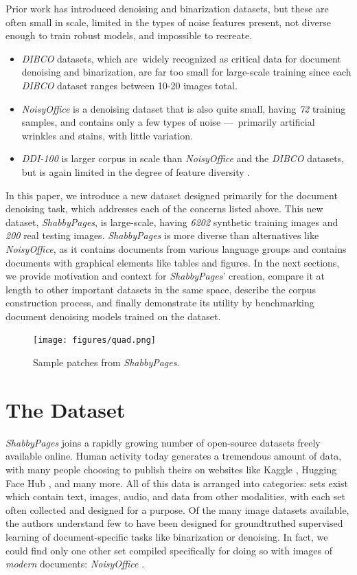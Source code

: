 \documentclass[runningheads]{llncs}
\begin{document}
Prior work has introduced denoising and binarization datasets, but these are often small in scale, limited in the types of noise features present, not diverse enough to train robust models, and impossible to recreate.
\begin{itemize}
\item \emph{DIBCO} datasets, which are widely recognized as critical data for document denoising and binarization, are far too small for large-scale training since each \emph{DIBCO} dataset ranges between 10-20 images total.
\item \emph{NoisyOffice} \cite{ref_NoisyOfficeDatabase} is a denoising dataset that is also quite small, having \emph{72} training samples, and contains only a few types of noise — primarily artificial wrinkles and stains, with little variation.
\item \emph{DDI-100} \cite{ddi-100-2019} is larger corpus in scale than \emph{NoisyOffice} and the \emph{DIBCO} datasets, but is again limited in the degree of feature diversity \cite{detection-masking-2022}.
\end{itemize}

In this paper, we introduce a new dataset designed primarily for the document denoising task, which addresses each of the concerns listed above.
This new dataset, \emph{ShabbyPages}, is large-scale, having \emph{6202} synthetic training images and \emph{200} real testing images.
\emph{ShabbyPages} is more diverse than alternatives like \emph{NoisyOffice}, as it contains documents from various language groups and contains documents with graphical elements like tables and figures.
In the next sections, we provide motivation and context for \emph{ShabbyPages}' creation, compare it at length to other important datasets in the same space, describe the corpus construction process, and finally demonstrate its utility by benchmarking document denoising models trained on the dataset.

\begin{figure}
\centering
\texttt{[image: figures/quad.png]}
\caption{Sample patches from \emph{ShabbyPages}.} \label{fig1}
\end{figure}

\section{The Dataset}
\emph{ShabbyPages} joins a rapidly growing number of open-source datasets freely available online.
Human activity today generates a tremendous amount of data, with many people choosing to publish theirs on websites like Kaggle \cite{ref_Kaggle}, Hugging Face Hub \cite{ref_HuggingFaceHub}, and many more.
All of this data is arranged into categories: sets exist which contain text, images, audio, and data from other modalities, with each set often collected and designed for a purpose.
Of the many image datasets available, the authors understand few to have been designed for groundtruthed supervised learning of document-specific tasks like binarization or denoising.
In fact, we could find only one other set compiled specifically for doing so with images of \textit{modern} documents: \emph{NoisyOffice} \cite{ref_NoisyOffice}.
\end{document}
